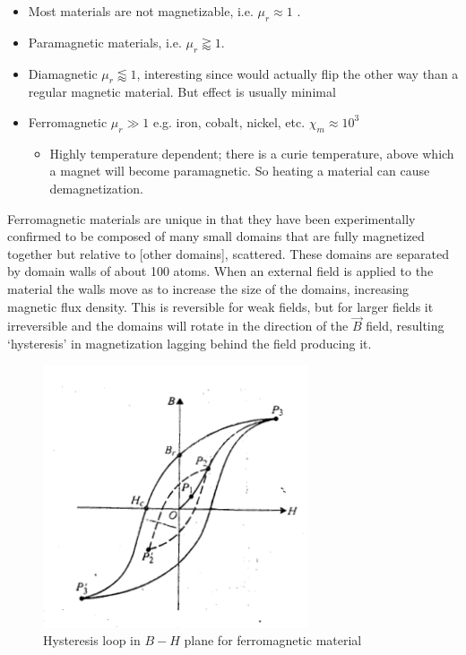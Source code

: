 \documentclass[10pt]{article}
\begin{document}
\begin{itemize}
	\item Most materials are not magnetizable, i.e. $ \mu_r \approx  1 $ .
	\item Paramagnetic materials, i.e. $ \mu_r \gtrapprox 1 $.
	\item Diamagnetic $ \mu_r \lessapprox 1 $, interesting since would actually flip the other way than a regular magnetic material. But effect is usually minimal
	\item Ferromagnetic $ \mu_r \gg 1 $ e.g. iron, cobalt, nickel, etc. $ \chi_m \approx  10^3 $ 
		\begin{itemize}
			\item Highly temperature dependent; there is a curie temperature, above which a magnet will become paramagnetic. So heating a material can cause demagnetization.
		\end{itemize}
\end{itemize}

Ferromagnetic materials are unique in that they have been experimentally confirmed to be composed of many small domains that are fully magnetized together but relative to [other domains], scattered. 
These domains are separated by domain walls of about 100 atoms.
When an external field is applied to the material the walls move as to increase the size of the domains, increasing magnetic flux density.
This is reversible for weak fields, but for larger fields it irreversible and the domains will rotate in the direction of the $ \vec{B} $  field, resulting `hysteresis' in magnetization lagging behind the field producing it.


\begin{figure}[H]
	\centering
	\includegraphics[width=0.8\linewidth]{img/image_2022-04-11-02-18-16.png}
	\caption{Hysteresis loop in $ B-H $ plane for ferromagnetic material}
\end{figure}
\end{document}
